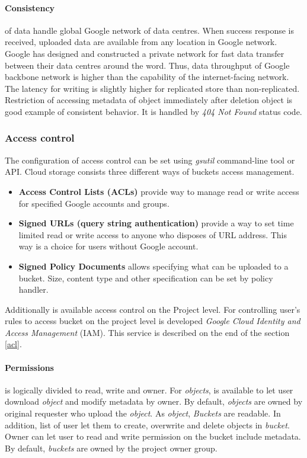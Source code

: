 \documentclass[a4paper,12pt,oneside]{report}
\begin{document}
	\paragraph{Consistency} of data handle global Google net\-work of data centres. 
	When success response is received, uploaded data are available from any location
	in 
	Google net\-work. Google has designed and constructed a private network 
	for fast data transfer between their data centres around the word. Thus, data
	throughput 
	of Google back\-bone network is higher than the capability of the 
	internet-facing network. The latency for writing is slightly higher for
	replicated store 
	than non-replicated. Restriction of accessing metadata of object immediately
	after deletion object is good example of consistent behavior.
	It is handled by \textit{404 Not Found} status code.
	
	
	\subsubsection{Access control}
	The configuration of access control can be set using \textit{gsutil}
	command-line tool 
	or API. Cloud storage consists three different ways of buckets access
	management.
	\begin{itemize}
		\item\textbf{Access Control Lists (ACLs)} provide way to manage read or write
		access for specified Google accounts and groups.
		\item\textbf{Signed URLs (query string authentication)} provide a way to set time 
		limited read or write access to anyone who disposes of URL address. This way is
		a choice for users without Google account.   
		\item\textbf{Signed Policy Documents} allows specifying what can be uploaded to
		a bucket. 
		Size, content type and other specification can be set by policy handler. 
	\end{itemize}
	Additionally is available access control on the Project level. For controlling 
	user's rules 
	to access bucket on the project level is developed   \textit{Google Cloud
		Identity and Access Management} (IAM). This service is described on 
	the end of the section \ref{acl}.
	
	\paragraph{Permissions} is logically divided to read, write and owner. For
	\textit{objects}, 
	is available to let user download \textit{object} and modify metadata by owner.
	By default, \textit{objects} are owned by original requester who 
	upload the \textit{object}. As \textit{object}, \textit{Buckets} are readable.
	In addition, list of user let them to create, overwrite and delete objects 
	in \textit{bucket}. Owner can let user to read and write permission on the
	bucket include metadata. By default, \textit{buckets} are owned by the project 
	owner group.
	
\end{document}
